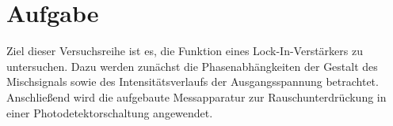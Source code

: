 \vfill

\section{Aufgabe}

Ziel dieser Versuchsreihe ist es, die Funktion eines Lock-In\hspace{0.1ex}-\hspace{-0.25ex}Verstärkers
zu untersuchen. Dazu werden zunächst die Phasenabhängkeiten der Gestalt des Mischsignals sowie des
\mbox{Intensitätsverlaufs} der Ausgangsspannung betrachtet. Anschließend wird die aufgebaute Messapparatur
zur Rauschunterdrückung in einer Photodetektorschaltung angewendet.

\newpage
